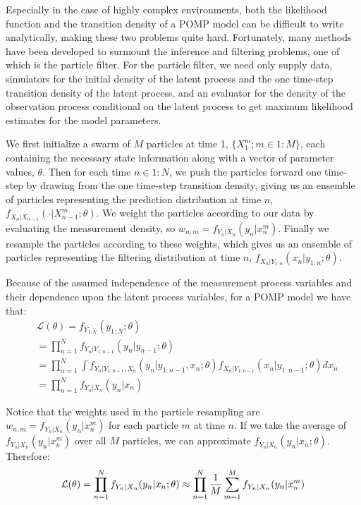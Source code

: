 \documentclass[12pt]{article}
\begin{document}
   Especially in the case of highly complex environments, both the likelihood function and the transition density of a POMP model can be difficult to write analytically, making these two problems quite hard. Fortunately, many methods have been developed to surmount the inference and filtering problems, one of which is the particle filter. For the particle filter, we need only supply data, simulators for the initial density of the latent process and the one time-step transition density of the latent process, and an evaluator for the density of the observation process conditional on the latent process to get maximum likelihood estimates for the model parameters. 
     
   We first initialize a swarm of $M$ particles at time 1, $\{ X_1^m; m \in 1:M \}$, each containing the necessary state information along with a vector of parameter values, $\theta$. Then for each time $n \in 1:N$, we push the particles forward one time-step by drawing from the one time-step transition density, giving us an ensemble of particles representing the prediction distribution at time $n$, $f_{X_n|X_{n-1}}(\cdot | X_{n-1}^m; \theta)$. We weight the particles according to our data by evaluating the measurement density, so $w_{n,m} = f_{Y_n|X_n}(y_n | x_n^m)$. Finally we resample the particles according to these weights, which gives us an ensemble of particles representing the filtering distribution at time $n$, $f_{X_n | Y_{1:n}}(x_n | y_{1:n}; \theta)$.
   
    Because of the assumed independence of the measurement process variables and their dependence upon the latent process variables, for a POMP model we have that:
         \begin{equation}
         \begin{split}
         & \mathcal{L}(\theta) = f_{Y_{1:N}}(y_{1:N}; \theta) \\
         & = \prod_{n=1}^N f_{Y_{n} | Y_{1:n-1}}(y_n | y_{n-1}; \theta) \\
         & = \prod_{n=1}^N \int f_{Y_n | Y_{1:n-1}, X_n}(y_n | y_{1:n-1}, x_n; \theta)f_{X_n | Y_{1:n-1}}(x_n | y_{1:n-1}; \theta) dx_n \\
         & = \prod_{n=1}^N f_{Y_n | X_n}(y_n | x_n)
         \end{split}
         \end{equation}
   
    Notice that the weights used in the particle resampling are $w_{n,m} = f_{Y_n|X_n}(y_n | x_n^m)$ for each particle $m$ at time $n$. If we take the average of $f_{Y_n|X_n}(y_n | x_n^m)$ over all $M$ particles, we can approximate $f_{Y_n|X_n}(y_n | x_n; \theta)$. Therefore: 
    \begin{equation}
    \mathcal{L}(\theta) = \prod_{n=1}^N f_{Y_n | X_n}(y_n | x_n; \theta) \approx \prod_{n=1}^N \frac{1}{M} \sum_{m = 1}^M f_{Y_n|X_n}(y_n | x_n^m) \\
    \end{equation}
   
\end{document}
